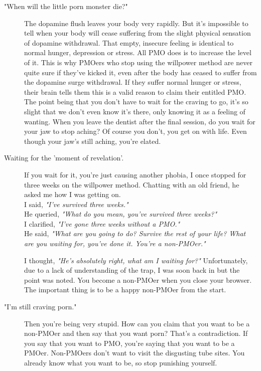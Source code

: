 \documentclass[easypeasy.tex]{subfiles}
\begin{document}
\begin{description}
\begin{description}
      \item["When will the little porn monster die?"]
        The dopamine flush leaves your body very rapidly. But it's impossible to tell when your body will cease suffering from the slight physical sensation of dopamine withdrawal. That empty, insecure feeling is identical to normal hunger, depression or stress. All PMO does is to increase the level of it. This is why PMOers who stop using the willpower method are never quite sure if they've kicked it, even after the body has ceased to suffer from the dopamine surge withdrawal. If they suffer normal hunger or stress, their brain tells them this is a valid reason to claim their entitled PMO. The point being that you don't have to wait for the craving to go, it's so slight that we don't even know it's there, only knowing it as a feeling of wanting. When you leave the dentist after the final session, do you wait for your jaw to stop aching? Of course you don't, you get on with life. Even though your jaw's still aching, you're elated.

      \item [Waiting for the 'moment of revelation'.] If you wait for it, you're just causing another phobia, I once stopped for three weeks on the willpower method. Chatting with an old friend, he asked me how I was getting on.\\
        I said, \textit{"I've survived three weeks."}\\
        He queried, \textit{"What do you mean, you've survived three weeks?"}\\
        I clarified, \textit{"I've gone three weeks without a PMO."}\\
        He said, \textit{"What are you going to do? Survive the rest of your life? What are you waiting for, you've done it. You're a non-PMOer."}

        I thought, \textit{"He's absolutely right, what am I waiting for?"} Unfortunately, due to a lack of understanding of the trap, I was soon back in but the point was noted. You become a non-PMOer when you close your browser. The important thing is to be a happy non-PMOer from the start.

      \item ["I'm still craving porn."] Then you're being very stupid. How can you claim that you want to be a non-PMOer and then say that you want porn? That's a contradiction. If you say that you want to PMO, you're saying that you want to be a PMOer. Non-PMOers don't want to visit the disgusting tube sites. You already know what you want to be, so stop punishing yourself.


\end{description}
\end{description}
\end{document}
